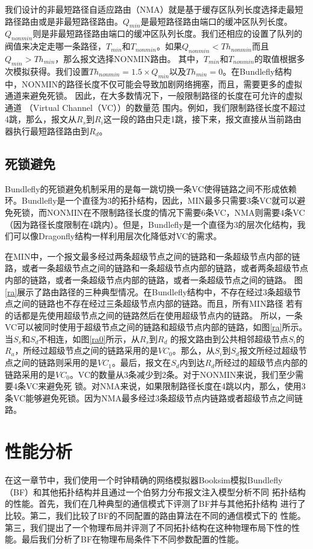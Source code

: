 我们设计的非最短路径自适应路由（NMA）就是基于缓存区队列长度选择走最短路径路由或是非最短路径路由。$Q_{min}$是最短路径路由端口的缓冲区队列长度。$Q_{nonmin}$则是非最短路径路由端口的缓冲区队列长度。我们还相应的设置了队列的阀值来决定走哪一条路径，$T_{min}$和$T_{nonmin}$。如果$Q_{nonmin}<Th_{nonmin}$而且$Q_{min}>Th_{min}$，那么报文选择NONMIN路由。
其中，$T_{min}$和$T_{nonmin}$的取值根据多次模拟获得。我们设置$Th_{nonmin}=1.5\times Q_{min}$以及$Th_{min}=0$。在Bundlefly结构中，NONMIN的路径长度不仅可能会导致加剧网络拥塞，而且，需要更多的虚拟通道来避免死锁。 因此，在大多数情况下，一般限制路径的长度在可允许的虚拟通道
（Virtual Channel（VC））的数量范
围内。例如，我们限制路径长度不超过4跳，那么，报文从$R_s$到$R_i$这一段的路由只走1跳，接下来，报文直接从当前路由器执行最短路径路由到$R_d$。

\subsection{死锁避免}

Bundlefly的死锁避免机制采用的是每一跳切换一条VC使得链路之间不形成依赖环。Bundlefly是一个直径为3的拓扑结构，因此，MIN最多只需要3条VC就可以避免死锁，而NONMIN在不限制路径长度的情况下需要6条VC，NMA则需要4条VC（因为路径长度限制在4跳内）。但是，Bundlefly是一个直径为3的层次化结构，我们可以像Dragonfly结构一样利用层次化降低对VC的需求。

在MIN中，一个报文最多经过两条超级节点之间的链路和一条超级节点内部的链路，或者一条超级节点之间的链路和一条超级节点内部的链路，或者两条超级节点内部的链路，或者一条超级节点内部的链路，或者一条超级节点之间的链路。
图\ref{ra}展示了路由路径的三种典型情况。在Bundlefly结构中，不存在经过3条超级节点之间的链路也不存在经过三条超级节点内部的链路。而且，所有MIN路径
若有的话都是先使用超级节点之间的链路然后在使用超级节点内的链路。
所以，一条VC可以被同时使用于超级节点之间的链路和超级节点内部的链路，如图\ref{ra}所示。当$S_s$和$S_d$不相连，如图\ref{ra0}所示，从$R_s$到$R_d$
的报文路由到公共相邻超级节点$S_i$的$R_a$，所经过超级节点之间的链路采用的是$VC_0$。那么，从$S_i$到$S_d$报文所经过超级节点之间的链路则采用的是$VC_1$。最后，报文在$S_d$内到达$R_d$所经过的超级节点内部的链路采用的是$VC_0$。VC的数量从3条减少到2条。对于NONMIN来说，我们至少需要4条VC来避免死
锁。对NMA来说，如果限制路径长度在4跳以内，那么，使用3条VC能够避免死锁。因为NMA最多经过3条超级节点内链路或者超级节点之间链路。

\section{性能分析}
在这一章节中，我们使用一个时钟精确的网络模拟器Booksim模拟Bundlefly （BF）和其他拓扑结构并且通过一个伯努力分布报文注入模型分析不同
拓扑结构的性能。首先，我们在几种典型的通信模式下评测了BF并与其他拓扑结构
进行了比较。第二，我们比较了BF的不同配置的路由算法在不同的通信模式下的
性能。第三，我们提出了一个物理布局并评测了不同拓扑结构在这种物理布局下性的性能。最后我们分析了BF在物理布局条件下不同参数配置的性能。


